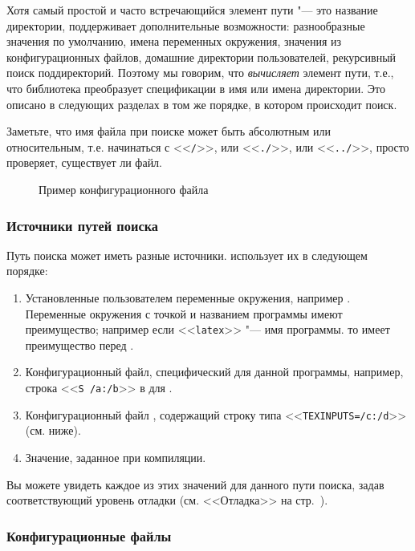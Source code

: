 \documentclass{article}
\renewcommand{\samp}[1]{<<\texttt{#1}>>}
\begin{document}
Хотя самый простой и часто встречающийся элемент пути "--- это
название директории, \KPS{} поддерживает дополнительные возможности:
разнообразные значения по умолчанию, имена переменных окружения,
значения из конфигурационных файлов, домашние директории
пользователей, рекурсивный поиск поддиректорий.  Поэтому мы говорим,
что \KPS{} \emph{вычисляет} элемент пути, т.е., что библиотека
преобразует спецификации в имя или имена директории.  Это описано в
следующих разделах в том же порядке, в котором происходит поиск.

Заметьте, что имя файла при поиске может быть абсолютным или
относительным, т.е. начинаться с \samp{/}, или \samp{./}, или
\samp{../}, \KPS{} просто проверяет, существует ли файл.

\ifSingleColumn
\else
\begin{figure*}

\setlength{\abovecaptionskip}{0pt}
  \caption{Пример конфигурационного файла}
  \label{fig:config-sample}
\end{figure*}
\fi

\subsubsection{Источники путей поиска}
\label{sec:path-sources}

Путь поиска может иметь разные источники. \KPS{} использует их в
следующем порядке:

\begin{enumerate}
\item Установленные пользователем переменные окружения, например
  \@. Переменные окружения с точкой и названием
  программы имеют преимущество; например если \samp{latex} "--- имя
  программы. то  имеет преимущество перед
  .
\item 
  Конфигурационный файл, специфический для данной программы, например,
  строка 
  \samp{S /a:/b} в  для .
\item  
  Конфигурационный файл \KPS{}  , содержащий строку
  типа 
  \samp{TEXINPUTS=/c:/d} (см. ниже).  
\item Значение, заданное при компиляции.
\end{enumerate} 
\noindent Вы можете увидеть каждое из этих значений для данного пути
поиска, задав соответствующий уровень отладки  (см. <<Отладка>>
на стр.~\pageref{sec:debugging}).

\subsubsection{Конфигурационные файлы}
\end{document}

